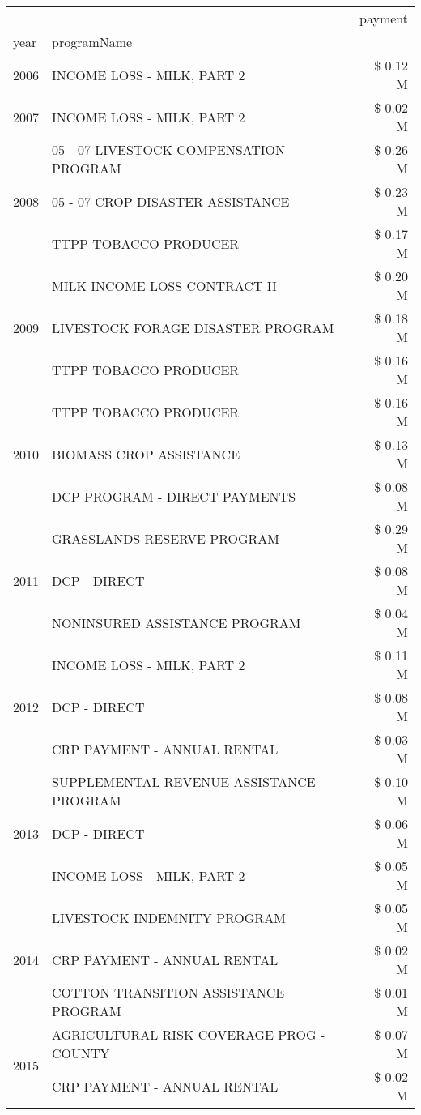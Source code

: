 \begin{tabular}{llr}
\toprule
 &  & payment \\
year & programName &  \\
\midrule
2006 & INCOME LOSS - MILK, PART 2 & \$ 0.12 M \\
\cline{1-3}
2007 & INCOME LOSS - MILK, PART 2 & \$ 0.02 M \\
\cline{1-3}
\multirow[t]{3}{*}{2008} & 05 - 07 LIVESTOCK COMPENSATION PROGRAM & \$ 0.26 M \\
 & 05 - 07 CROP DISASTER ASSISTANCE & \$ 0.23 M \\
 & TTPP TOBACCO PRODUCER & \$ 0.17 M \\
\cline{1-3}
\multirow[t]{3}{*}{2009} & MILK INCOME LOSS CONTRACT II & \$ 0.20 M \\
 & LIVESTOCK FORAGE DISASTER  PROGRAM & \$ 0.18 M \\
 & TTPP TOBACCO PRODUCER & \$ 0.16 M \\
\cline{1-3}
\multirow[t]{3}{*}{2010} & TTPP TOBACCO PRODUCER & \$ 0.16 M \\
 & BIOMASS CROP ASSISTANCE & \$ 0.13 M \\
 & DCP PROGRAM - DIRECT PAYMENTS & \$ 0.08 M \\
\cline{1-3}
\multirow[t]{3}{*}{2011} & GRASSLANDS RESERVE PROGRAM & \$ 0.29 M \\
 & DCP - DIRECT & \$ 0.08 M \\
 & NONINSURED ASSISTANCE PROGRAM & \$ 0.04 M \\
\cline{1-3}
\multirow[t]{3}{*}{2012} & INCOME LOSS - MILK, PART 2 & \$ 0.11 M \\
 & DCP - DIRECT & \$ 0.08 M \\
 & CRP PAYMENT - ANNUAL RENTAL & \$ 0.03 M \\
\cline{1-3}
\multirow[t]{3}{*}{2013} & SUPPLEMENTAL REVENUE ASSISTANCE PROGRAM & \$ 0.10 M \\
 & DCP - DIRECT & \$ 0.06 M \\
 & INCOME LOSS - MILK, PART 2 & \$ 0.05 M \\
\cline{1-3}
\multirow[t]{3}{*}{2014} & LIVESTOCK INDEMNITY PROGRAM & \$ 0.05 M \\
 & CRP PAYMENT - ANNUAL RENTAL & \$ 0.02 M \\
 & COTTON TRANSITION ASSISTANCE PROGRAM & \$ 0.01 M \\
\cline{1-3}
\multirow[t]{3}{*}{2015} & AGRICULTURAL RISK COVERAGE PROG - COUNTY & \$ 0.07 M \\
 & CRP PAYMENT - ANNUAL RENTAL & \$ 0.02 M \\

\end{tabular}

